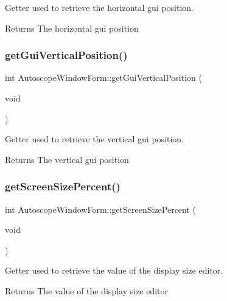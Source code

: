 Getter used to retrieve the horizontal gui position. 

\begin{DoxyReturn}{Returns}
The horizontal gui position 
\end{DoxyReturn}
\mbox{\label{class_autoscope_window_form_a0d92cd0c7342749009e12058517ba060}} 
\subsubsection{\texorpdfstring{getGuiVerticalPosition()}{getGuiVerticalPosition()}}
{\footnotesize\ttfamily int Autoscope\+Window\+Form\+::get\+Gui\+Vertical\+Position (\begin{DoxyParamCaption}\item[{void}]{ }\end{DoxyParamCaption})}



Getter used to retrieve the vertical gui position. 

\begin{DoxyReturn}{Returns}
The vertical gui position 
\end{DoxyReturn}
\mbox{\label{class_autoscope_window_form_a51b6c47d99b53207d9e65157f01270ff}} 
\subsubsection{\texorpdfstring{getScreenSizePercent()}{getScreenSizePercent()}}
{\footnotesize\ttfamily int Autoscope\+Window\+Form\+::get\+Screen\+Size\+Percent (\begin{DoxyParamCaption}\item[{void}]{ }\end{DoxyParamCaption})}



Getter used to retrieve the value of the display size editor. 

\begin{DoxyReturn}{Returns}
The value of the display size editor 
\end{DoxyReturn}
\mbox{\label{class_autoscope_window_form_a084c9da4dd3374105e3dd0302e5db578}} 
